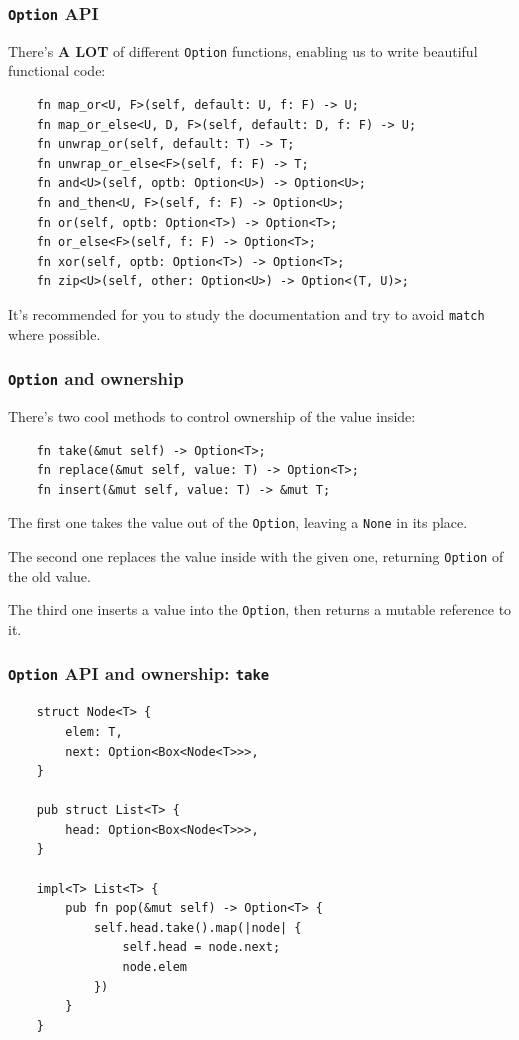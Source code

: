 \documentclass[aspectratio=1610,t]{beamer}
\begin{document}
\begin{frame}[fragile]
\frametitle{\texttt{Option} API}
There's \textbf{A LOT} of different \texttt{Option} functions, enabling us to write beautiful functional code:

\begin{verbatim}
    fn map_or<U, F>(self, default: U, f: F) -> U;
    fn map_or_else<U, D, F>(self, default: D, f: F) -> U;
    fn unwrap_or(self, default: T) -> T;
    fn unwrap_or_else<F>(self, f: F) -> T;
    fn and<U>(self, optb: Option<U>) -> Option<U>;
    fn and_then<U, F>(self, f: F) -> Option<U>;
    fn or(self, optb: Option<T>) -> Option<T>;
    fn or_else<F>(self, f: F) -> Option<T>;
    fn xor(self, optb: Option<T>) -> Option<T>;
    fn zip<U>(self, other: Option<U>) -> Option<(T, U)>;
\end{verbatim}

It's recommended for you to study the documentation and try to avoid \texttt{match} where possible.
\end{frame}


\begin{frame}[fragile]
\frametitle{\texttt{Option} and ownership}
There's two cool methods to control ownership of the value inside:

\begin{verbatim}
    fn take(&mut self) -> Option<T>;
    fn replace(&mut self, value: T) -> Option<T>;
    fn insert(&mut self, value: T) -> &mut T;
\end{verbatim}

The first one takes the value out of the \texttt{Option}, leaving a \texttt{None} in its place.

The second one replaces the value inside with the given one, returning \texttt{Option} of the old value.

The third one inserts a value into the \texttt{Option}, then returns a mutable reference to it.
\end{frame}


\begin{frame}[fragile,c]
\frametitle{\texttt{Option} API and ownership: \texttt{take}}
\begin{verbatim}
    struct Node<T> {
        elem: T,
        next: Option<Box<Node<T>>>,
    }

    pub struct List<T> {
        head: Option<Box<Node<T>>>,
    }

    impl<T> List<T> {
        pub fn pop(&mut self) -> Option<T> {
            self.head.take().map(|node| {
                self.head = node.next;
                node.elem
            })
        }
    }
\end{verbatim}
\end{frame}
\end{document}
